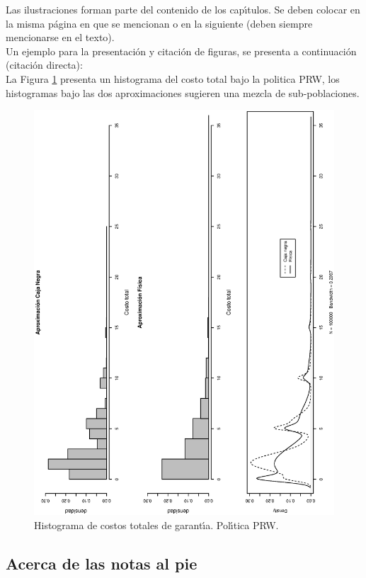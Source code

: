 Las ilustraciones forman parte del contenido de los cap\'{\i}tulos. Se deben colocar en la misma p\'{a}gina en que se mencionan o en la siguiente (deben siempre mencionarse en el texto).\\

Un ejemplo para la presentaci\'{o}n y citaci\'{o}n de figuras, se presenta a continuaci\'{o}n (citaci\'{o}n directa):\\

La Figura \ref{Fi} presenta un histograma del costo total bajo la politica PRW, los histogramas bajo las dos aproximaciones sugieren una mezcla de sub-poblaciones.

\begin{figure}
\centering
\includegraphics[scale=0.4, angle=-90]{Kap3/Fig_Cap3/Costo_Total}
\caption{Histograma de costos totales de garant\'{\i}a. Pol\'{\i}tica PRW.} \label{Fi}
\end{figure}

\subsection*{Acerca de las notas al pie}

